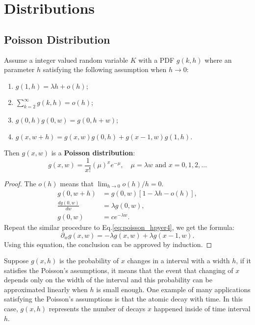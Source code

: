 
\section{Distributions}

\subsection{Poisson Distribution}
\begin{definition}
Assume a integer valued random variable $K$ with a PDF $g(k,h)$ where an parameter $h$ satisfying the following assumption when $h\to 0$:
\begin{enumerate}
\item $g(1,h) = \lambda h+o(h)$;
\item $\sum_{k=2}^{\infty}g(k,h)=o(h)$;
\item $g(0,h)g(0,w)=g(0,h+w)$;\label{eq:poisson_hpyer3}
\item $g(x,w+h)=g(x,w)g(0,h)+g(x-1,w)g(1,h)$.\label{eq:poisson_hpyer4}
\end{enumerate}
Then $g(x,w)$ is a \textbf{Poisson distribution}:
\begin{equation}
g(x,w)=\frac{1}{x!}(\mu)^xe^{-\mu},\quad \mu=\lambda w\,\, \text{and}\,\, x=0,1,2,\dots
\end{equation}
\end{definition}
\begin{proof}
The $o(h)$ means that $\lim_{h\to 0}o(h)/h=0$. 
\begin{equation*}
\begin{aligned}
g(0,w+h)&=g(0,w)[1-\lambda h-o(h)],\\
\frac{dg(0,w)}{dw}&=\lambda g(0,w),\\
g(0,w)&=ce^{-\lambda w}.
\end{aligned}
\end{equation*}
Repeat the similar procedure to Eq.\ref{eq:poisson_hpyer4}, we get the formula:
\begin{equation*}
\partial_wg(x,w)=-\lambda g(x,w)+\lambda g(x-1,w).
\end{equation*}
Using this equation, the conclusion can be approved by induction.
\end{proof}
Suppose $g(x,h)$ is the probability of $x$ changes in a interval with a width $h$, if it satisfies the Poisson's assumptions, it means that the event that changing of $x$ depends only on the width of the interval and this probability can be approximated linearly when $h$ is small enough. One example of many applications satisfying the Poisson's assumptions is that the atomic decay with time. In this case, $g(x,h)$ represents the number of decays $x$ happened inside of time interval $h$. 

